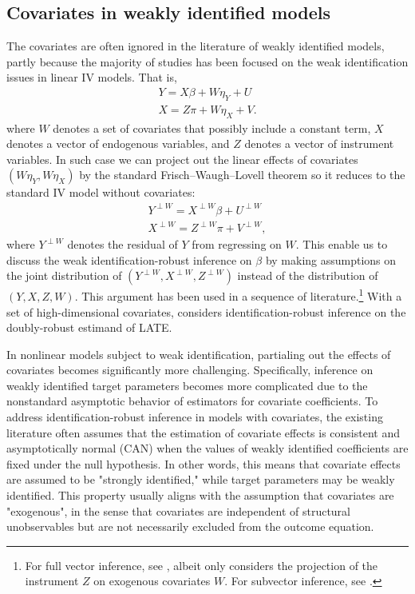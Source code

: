 \documentclass[11pt]{article}
\theoremstyle{definition}
\newcommand{\0}{\ensuremath{\mathbf{0}}}
\begin{document}
\begin{bibunit}
\subsection{Covariates in weakly identified models}
\label{appendix:cov_weakIV}
The covariates are often ignored in the literature of weakly identified models, partly because the majority of studies has been focused on the weak identification issues in linear IV models. That is, 
\begin{align*}
	Y = X \beta + W \eta_Y + U \\
	X = Z \pi + W \eta_X + V.
\end{align*}
where $W$ denotes a set of covariates that possibly include a constant term, $X$ denotes a vector of endogenous variables, and $Z$ denotes a vector of instrument variables. 
In such case we can project out the linear effects of covariates $(W\eta_Y, W\eta_X)$ by the standard Frisch–Waugh–Lovell theorem so it reduces to the standard IV model without covariates:
\begin{align*}
	Y^{\perp W} = X^{\perp W}\beta + U^{\perp W} \\
	X^{\perp W} = Z^{\perp W}\pi + V^{\perp W}, 
\end{align*}
where $Y^{\perp W}$ denotes the residual of $Y$ from regressing on $W$. This enable us to discuss the weak identification-robust inference on $\beta$ by making assumptions on the joint distribution of $(Y^{\perp W}, X^{\perp W}, Z^{\perp W})$ instead of the distribution of $(Y, X, Z, W)$. This argument has been used in a sequence of literature.\footnote{For full vector inference, see \citet{stock/staiger:1997, kleibergen:2002, moreira:2003}, albeit \citet{moreira:2003} only considers the projection of the instrument $Z$ on exogenous covariates $W$. For subvector inference, see \citet{gkmc:2012, gkm:2019}.} With a set of high-dimensional covariates, \cite{ma:2023} considers identification-robust inference on the doubly-robust estimand of LATE.

In nonlinear models subject to weak identification, partialing out the effects of covariates becomes significantly more challenging. Specifically, inference on weakly identified target parameters becomes more complicated due to the nonstandard asymptotic behavior of estimators for covariate coefficients. To address identification-robust inference in models with covariates, the existing literature often assumes that the estimation of covariate effects is consistent and asymptotically normal (CAN) when the values of weakly identified coefficients are fixed under the null hypothesis. In other words, this means that covariate effects are assumed to be "strongly identified," while target parameters may be weakly identified. This property usually aligns with the assumption that covariates are "exogenous", in the sense that covariates are independent of structural unobservables but are not necessarily excluded from the outcome equation. 


\end{bibunit}
\end{document}
